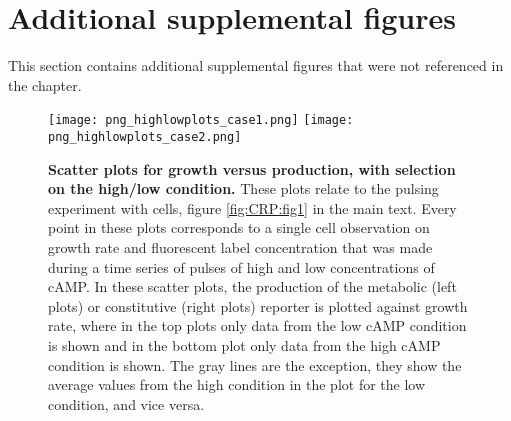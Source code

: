 
\FloatBarrier
\clearpage
\section*{Additional supplemental figures}

This section contains additional supplemental figures that were not referenced in the chapter.

\begin{figure}%
	\centering
	\texttt{[image: png\_highlowplots\_case1.png]}
	\texttt{[image: png\_highlowplots\_case2.png]}	
	\caption{ 
		\textbf{Scatter plots for growth versus production, with selection on the high/low condition.}
        These plots relate to the pulsing experiment with \dcamp cells, figure \ref{fig:CRP:fig1} in the main text.
        Every point in these plots corresponds to a single cell observation on growth rate and fluorescent label concentration
        that was made during a time series of pulses of high and low concentrations of cAMP.
		In these scatter plots, the production of the metabolic (left plots) or constitutive (right plots) reporter is plotted against growth rate, where in the top plots only data from the low cAMP condition is shown and in the bottom plot only data from the high cAMP condition is shown. The gray lines are the exception, they show the average values from the high condition in the plot for the low condition, and vice versa.		
	}
	\label{fig:CRP:highlowproductionscatters}
\end{figure}%


